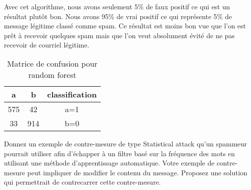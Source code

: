 \begin{homeworkProblem}
\begin{homeworkSection}{3.3}
{			Avec cet algorithme, nous avons seulement 5\% de faux positif ce qui est un résultat plutôt bon.
			Nous avons 95\% de vrai positif ce qui représente 5\% de message légitime classé comme spam.
			Ce résultat est moins bon vue que l'on est prêt à recevoir quelques spam mais que l'on veut absolument évité de ne pas recevoir de courriel légitime.
						
			
			}
			\begin{table}
			\centering
			\begin{tabular}{|c|c||c|}
			
			\hline 
			a & b & classification \\ 
			\hline 
			575 & 42 & a=1 \\ 
			\hline 
			33 & 914 & b=0 \\ 
			\hline 
			\end{tabular} 
			\caption{Matrice de confusion pour random forest}
			\label{tab:confMat33}			
			\end{table}						
		\end{homeworkSection}
		
		\begin{homeworkSection}{3.4}

			Donnez un exemple de contre-mesure de type Statistical attack qu'un spammeur
			pourrait utiliser afin d'échapper à un filtre basé sur la fréquence des mots en utilisant une
			méthode d'apprentissage automatique. Votre exemple de contre-mesure peut impliquer de
			modifier le contenu du message. Proposez une solution qui permettrait de contrecarrer
			cette contre-mesure.

			
		\end{homeworkSection}
		
			
	\end{homeworkProblem}